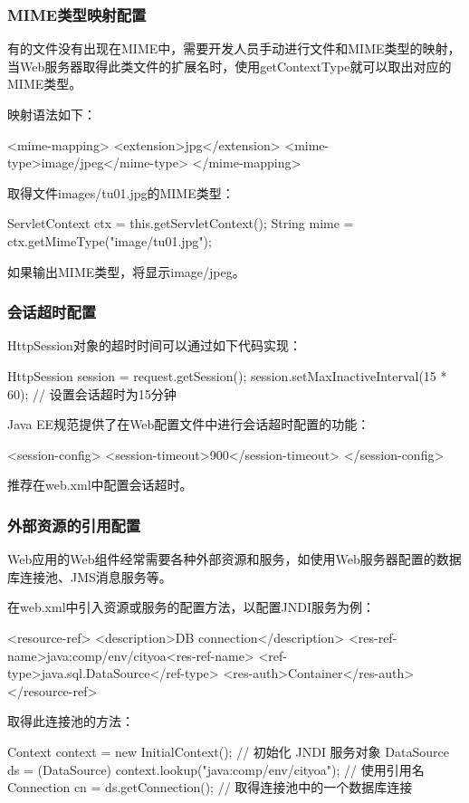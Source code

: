 \begin{frame}[fragile] %
\frametitle{MIME类型映射配置} 

有的文件没有出现在MIME中，需要开发人员手动进行文件和MIME类型的映射，当Web服务器取得此类文件的扩展名时，使用getContextType就可以取出对应的MIME类型。

映射语法如下：

\begin{xmlCode}
<mime-mapping>  
  <extension>jpg</extension>
  <mime-type>image/jpeg</mime-type>
</mime-mapping>  
\end{xmlCode}

取得文件images/tu01.jpg的MIME类型：

\begin{javaCode}
ServletContext ctx = this.getServletContext();
String mime = ctx.getMimeType("image/tu01.jpg");
\end{javaCode}

如果输出MIME类型，将显示image/jpeg。
\end{frame}

\begin{frame}[fragile] %
\frametitle{会话超时配置} 

HttpSession对象的超时时间可以通过如下代码实现：

\begin{javaCode}
HttpSession session = request.getSession();
session.setMaxInactiveInterval(15 * 60); // 设置会话超时为15分钟
\end{javaCode}

Java EE规范提供了在Web配置文件中进行会话超时配置的功能：

\begin{xmlCode}
<session-config>
  <session-timeout>900</session-timeout>
</session-config>
\end{xmlCode}

推荐在web.xml中配置会话超时。
\end{frame}

\begin{frame}[fragile] %
\frametitle{外部资源的引用配置} 

Web应用的Web组件经常需要各种外部资源和服务，如使用Web服务器配置的数据库连接池、JMS消息服务等。

在web.xml中引入资源或服务的配置方法，以配置JNDI服务为例：

\begin{xmlCode}
<resource-ref>  
  <description>DB connection</description>
  <res-ref-name>java:comp/env/cityoa<res-ref-name>
  <ref-type>java.sql.DataSource</ref-type>
  <res-auth>Container</res-auth>
</resource-ref>  
\end{xmlCode}

取得此连接池的方法：

\begin{javaCode}
Context context = new InitialContext(); // 初始化 JNDI 服务对象
DataSource ds = (DataSource) context.lookup("java:comp/env/cityoa");  // 使用引用名
Connection cn = ds.getConnection(); // 取得连接池中的一个数据库连接
\end{javaCode}
\end{frame}

